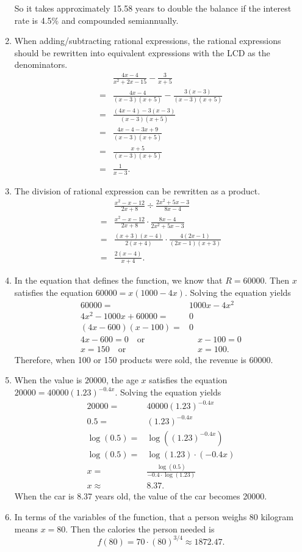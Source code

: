 \documentclass[
  12pt]{article}
\begin{document}
\begin{enumerate}
\[  \] So it takes approximately 15.58 years to double the balance if the
  interest rate is 4.5\% and compounded semiannually.
\item
  When adding/subtracting rational expressions, the rational expressions
  should be rewritten into equivalent expressions with the LCD as the
  denominators. \[
  \begin{aligned}
  &\frac{4x-4}{x^2+2x-15}-\frac{3}{x+5}\\
  =&\frac{4x-4}{(x-3)(x+5)}-\frac{3(x-3)}{(x-3)(x+5)}\\
  =&\frac{(4x-4)-3(x-3)}{(x-3)(x+5)}\\
  =&\frac{4x-4-3x+9}{(x-3)(x+5)}\\
  =&\frac{x+5}{(x-3)(x+5)}\\
  =&\frac{1}{x-3}.
  \end{aligned}
  \]
\item
  The division of rational expression can be rewritten as a product. \[
  \begin{aligned}
  &\frac{x^2-x-12}{2x+8}\div\frac{2x^2+5x-3}{8x-4}\\
  =&\frac{x^2-x-12}{2x+8}\cdot\frac{8x-4}{2x^2+5x-3}\\
  =&\frac{(x+3)(x-4)}{2(x+4)}\cdot\frac{4(2x-1)}{(2x-1)(x+3)}\\
  =&\frac{2(x-4)}{x+4}.
  \end{aligned}
  \]
\item
  In the equation that defines the function, we know that \(R=60000\).
  Then \(x\) satisfies the equation \(60000=x(1000-4x)\). Solving the
  equation yields \[
  \begin{aligned}
  60000=&1000x-4x^2\\
  4x^2-1000x+60000=&0\\
  (4x-600)(x-100)=&0\\
  4x-600=0\quad\text{or}&\quad x-100=0\\
  x=150\quad\text{or}&\quad x=100.
  \end{aligned}
  \] Therefore, when 100 or 150 products were sold, the revenue is
  60000.
\item
  When the value is \(20000\), the age \(x\) satisfies the equation
  \(20000=40000(1.23)^{-0.4x}\). Solving the equation yields \[
  \begin{aligned}
  20000=&40000(1.23)^{-0.4x}\\
  0.5=&(1.23)^{-0.4x}\\
  \log(0.5)=&\log((1.23)^{-0.4x})\\
  \log(0.5)=&\log(1.23)\cdot(-0.4x)\\
  x=&\frac{\log(0.5)}{-0.4\cdot\log(1.23)}\\
  x\approx&8.37.
  \end{aligned}
  \] When the car is 8.37 years old, the value of the car becomes 20000.
\item
  In terms of the variables of the function, that a person weighs 80
  kilogram means \(x=80\). Then the calories the person needed is
  \[f(80)=70\cdot(80)^{3/4}\approx 1872.47.\]


\end{enumerate}
\end{document}

